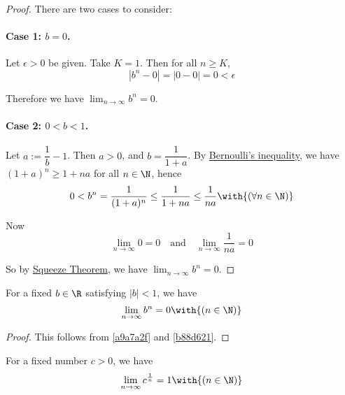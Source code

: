 \begin{proof}
  There are two cases to consider:

  \paragraph{Case 1: $b=0$.}

  Let $\epsilon>0$ be given. Take $K=1$. Then for all $n\geq K$,
  $$
    |b^n-0|=|0-0|=0<\epsilon
  $$

  Therefore we have $\displaystyle\lim_{n\to\infty}b^n=0$.

  \paragraph{Case 2: $0<b<1$.}

  Let $a:=\dfrac1b-1$. Then $a>0$, and $b=\dfrac1{1+a}$. By
  \href{d44713f}{Bernoulli's inequality}, we have $(1+a)^n\geq1+na$ for all
  $n\in\N$, hence
  $$
    0<b^n=\frac1{(1+a)^n}\leq\frac1{1+na}\leq\frac1{na}\with{(\forall n\in\N)}
  $$

  Now
  $$
    \lim_{n\to\infty}0=0\quad\text{and}\quad\lim_{n\to\infty}\frac1{na}=0
  $$

  So by \href{c3364d9}{Squeeze Theorem}, we have
  $\displaystyle\lim_{n\to\infty}b^n=0$.
\end{proof}

\label{aa16570}

For a fixed $b\in\R$ satisfying $|b|<1$, we have
$$
  \lim_{n\to\infty}b^n=0\with{(n\in\N)}
$$

\begin{proof}
  This follows from \autoref{a9a7a2f} and \autoref{b88d621}.
\end{proof}

\label{e97e8a0}

For a fixed number $c>0$, we have
$$
  \lim_{n\to\infty}c^\frac1n=1\with{(n\in\N)}
$$

